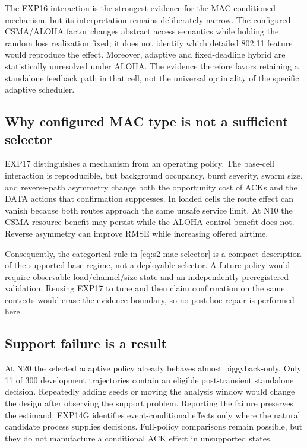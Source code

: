 The EXP16 interaction is the strongest evidence for the MAC-conditioned
mechanism, but its interpretation remains deliberately narrow. The configured
CSMA/ALOHA factor changes abstract access semantics while holding the random
loss realization fixed; it does not identify which detailed 802.11 feature
would reproduce the effect. Moreover, adaptive and fixed-deadline hybrid are
statistically unresolved under ALOHA. The evidence therefore favors retaining
a standalone feedback path in that cell, not the universal optimality of the
specific adaptive scheduler.

\subsection{Why configured MAC type is not a sufficient selector}

EXP17 distinguishes a mechanism from an operating policy. The base-cell
interaction is reproducible, but background occupancy, burst severity, swarm
size, and reverse-path asymmetry change both the opportunity cost of ACKs and
the DATA actions that confirmation suppresses. In loaded cells the route
effect can vanish because both routes approach the same unsafe service limit.
At N10 the CSMA resource benefit may persist while the ALOHA control benefit
does not. Reverse asymmetry can improve RMSE while increasing offered airtime.

Consequently, the categorical rule in \eqref{eq:s2-mac-selector} is a compact
description of the supported base regime, not a deployable selector. A future
policy would require observable load/channel/size state and an independently
preregistered validation. Reusing EXP17 to tune and then claim confirmation on
the same contexts would erase the evidence boundary, so no post-hoc repair is
performed here.

\subsection{Support failure is a result}

At N20 the selected adaptive policy already behaves almost piggyback-only.
Only 11 of 300 development trajectories contain an eligible post-transient
standalone decision. Repeatedly adding seeds or moving the analysis window
would change the design after observing the support problem. Reporting the
failure preserves the estimand: EXP14G identifies event-conditional effects
only where the natural candidate process supplies decisions. Full-policy
comparisons remain possible, but they do not manufacture a conditional ACK
effect in unsupported states.

